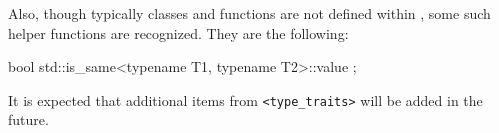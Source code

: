 Also, though typically \lang classes and functions are not defined within
\NAME, some such helper functions are recognized. They are the following:

\begin{listing-nonumber}
bool std::is_same<typename T1, typename T2>::value ;
\end{listing-nonumber}


It is expected that additional items from \lstinline|<type_traits>| will be added in the future.

